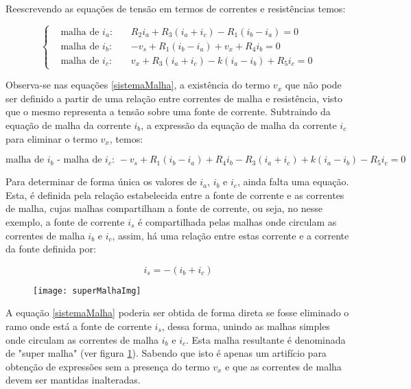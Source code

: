 \documentclass[12pt,fleqn]{book} %
\begin{document}
\begin{example}[]
    Reescrevendo as equações de tensão em termos de correntes e resistências temos:
    
    \begin{equation}\label{sistemaMalha}
     \left\{\begin{aligned} & 
        \text{malha de $i_a$: } && R_2 i_a+R_3 (i_a+i_c )-R_1 (i_b-i_a )=0\\& 
        \text{malha de $i_b$: } && -v_s+R_1 (i_b-i_a )+v_x+R_4 i_b=0\\& 
        \text{malha de $i_c$: } && v_x+R_3 (i_a+i_c )-k(i_a-i_b )+R_5 i_c=0
    \end{aligned}\right.
    \end{equation}
    
    Observa-se nas equações \ref{sistemaMalha}, a existência do termo $v_x$ que não pode ser definido a partir de uma relação entre correntes de malha e resistência, visto que o mesmo representa a tensão sobre uma fonte de corrente. Subtraindo da equação de malha da corrente $i_b$, a expressão da equação de malha da corrente $i_c$ para eliminar o termo $v_x$, temos:

\begin{equation}\label{sistemaMalha}    
 \text{malha de $i_b$ - malha de $i_c$: } -v_s+R_1 (i_b-i_a )+R_4 i_b-R_3 (i_a+i_c )+k(i_a-i_b )-R_5 i_c=0 
\end{equation}

Para determinar de forma única os valores de $i_a$, $i_b$ e $i_c$, ainda falta uma equação. Esta, é definida pela relação estabelecida entre a fonte de corrente e as correntes de malha, cujas malhas compartilham a fonte de corrente, ou seja, no nesse exemplo, a fonte de corrente $i_s$ é compartilhada pelas malhas onde circulam as correntes de malha $i_b$ e $i_c$, assim, há uma relação entre estas corrente e a corrente da fonte definida por:

\begin{equation}
i_s=-(i_b+i_c )
\end{equation}

\begin{figure}[!htbp] \centering\texttt{[image: superMalhaImg]}
            \caption{}\label{superMalhaImg} 
        \end{figure}
    
A equação \ref{sistemaMalha} poderia ser obtida de forma direta se fosse eliminado o ramo onde está a fonte de corrente $i_s$, dessa forma, unindo as malhas simples onde circulam as correntes de malha $i_b$ e $i_c$. Esta malha resultante é denominada de "super malha" (ver figura \ref{superMalhaImg}). Sabendo que isto é apenas um artifício para obtenção de expressões sem a presença do termo $v_x$ e que as correntes de malha devem ser mantidas inalteradas.
\end{example}
\end{document}
